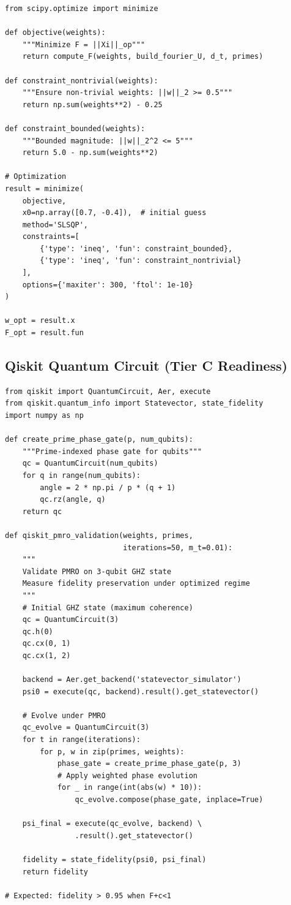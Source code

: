 \documentclass[11pt,a4paper]{article}
\begin{document}
\begin{lstlisting}[caption={Weight optimization against F}]
from scipy.optimize import minimize

def objective(weights):
    """Minimize F = ||Xi||_op"""
    return compute_F(weights, build_fourier_U, d_t, primes)

def constraint_nontrivial(weights):
    """Ensure non-trivial weights: ||w||_2 >= 0.5"""
    return np.sum(weights**2) - 0.25

def constraint_bounded(weights):
    """Bounded magnitude: ||w||_2^2 <= 5"""
    return 5.0 - np.sum(weights**2)

# Optimization
result = minimize(
    objective,
    x0=np.array([0.7, -0.4]),  # initial guess
    method='SLSQP',
    constraints=[
        {'type': 'ineq', 'fun': constraint_bounded},
        {'type': 'ineq', 'fun': constraint_nontrivial}
    ],
    options={'maxiter': 300, 'ftol': 1e-10}
)

w_opt = result.x
F_opt = result.fun
\end{lstlisting}

\subsection{Qiskit Quantum Circuit (Tier C Readiness)}

\begin{lstlisting}[caption={Qiskit 3-qubit PMRO harness}]
from qiskit import QuantumCircuit, Aer, execute
from qiskit.quantum_info import Statevector, state_fidelity
import numpy as np

def create_prime_phase_gate(p, num_qubits):
    """Prime-indexed phase gate for qubits"""
    qc = QuantumCircuit(num_qubits)
    for q in range(num_qubits):
        angle = 2 * np.pi / p * (q + 1)
        qc.rz(angle, q)
    return qc

def qiskit_pmro_validation(weights, primes, 
                           iterations=50, m_t=0.01):
    """
    Validate PMRO on 3-qubit GHZ state
    Measure fidelity preservation under optimized regime
    """
    # Initial GHZ state (maximum coherence)
    qc = QuantumCircuit(3)
    qc.h(0)
    qc.cx(0, 1)
    qc.cx(1, 2)
    
    backend = Aer.get_backend('statevector_simulator')
    psi0 = execute(qc, backend).result().get_statevector()
    
    # Evolve under PMRO
    qc_evolve = QuantumCircuit(3)
    for t in range(iterations):
        for p, w in zip(primes, weights):
            phase_gate = create_prime_phase_gate(p, 3)
            # Apply weighted phase evolution
            for _ in range(int(abs(w) * 10)):
                qc_evolve.compose(phase_gate, inplace=True)
    
    psi_final = execute(qc_evolve, backend) \
                .result().get_statevector()
    
    fidelity = state_fidelity(psi0, psi_final)
    return fidelity

# Expected: fidelity > 0.95 when F+c<1
\end{lstlisting}
\end{document}

